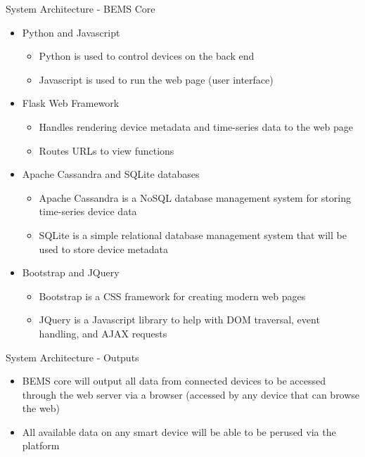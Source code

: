 \documentclass{beamer}
\begin{document}
\begin{frame}{System Architecture - BEMS Core}{} %
    \begin{itemize}
        \item Python and Javascript
            \begin{itemize}
                \item Python is used to control devices on the back end
                \item Javascript is used to run the web page (user interface)
            \end{itemize}
        \item Flask Web Framework
            \begin{itemize}
                \item Handles rendering device metadata and time-series data to the web page
                \item Routes URLs to view functions
            \end{itemize}
        \item Apache Cassandra and SQLite databases
            \begin{itemize}
                \item Apache Cassandra is a NoSQL database management system for storing time-series device data
                \item SQLite is a simple relational database management system that will be used to store device metadata
            \end{itemize}
        \item Bootstrap and JQuery
            \begin{itemize}
                \item Bootstrap is a CSS framework for creating modern web pages
                \item JQuery is a Javascript library to help with DOM traversal, event handling, and AJAX requests
            \end{itemize}
    \end{itemize}
\end{frame}

\begin{frame}{System Architecture - Outputs}{}
\begin{itemize}
    \item BEMS core will output all data from connected devices to be accessed through the web server via a browser (accessed by any device that can browse the web)
    \item All available data on any smart device will be able to be perused via the platform
\end{itemize}    
\end{frame}
\end{document}
